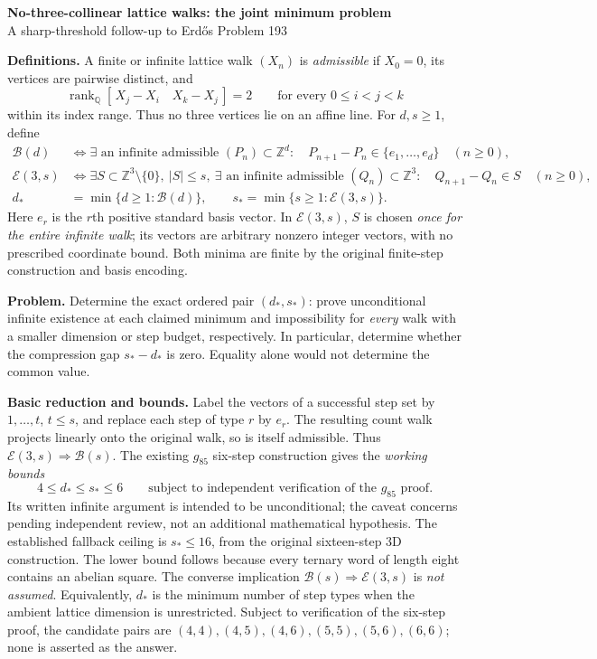 \documentclass[10pt]{article}
\newcommand{\Z}{\mathbb Z}
\newcommand{\Q}{\mathbb Q}
\newcommand{\B}{\mathcal B}
\newcommand{\E}{\mathcal E}
\begin{document}
\begin{center}
{\Large\bfseries No-three-collinear lattice walks: the joint minimum problem}\\[3pt]
{\small A sharp-threshold follow-up to Erd\H{o}s Problem 193}
\end{center}

\textbf{Definitions.}
A finite or infinite lattice walk $(X_n)$ is \emph{admissible} if $X_0=0$,
its vertices are pairwise distinct, and
\[
 \operatorname{rank}_{\Q}[\,X_j-X_i\quad X_k-X_j\,]=2
 \qquad\text{for every }0\le i<j<k
\]
within its index range. Thus no three vertices lie on an affine line.
For $d,s\ge1$, define
\begin{align*}
 \B(d)&\iff \exists\text{ an infinite admissible }(P_n)\subset\Z^d:
       \quad P_{n+1}-P_n\in\{e_1,\ldots,e_d\}\quad(n\ge0),\\
 \E(3,s)&\iff \exists S\subset\Z^3\setminus\{0\},\ |S|\le s,\
       \exists\text{ an infinite admissible }(Q_n)\subset\Z^3:\quad
       Q_{n+1}-Q_n\in S\quad(n\ge0),\\[-2pt]
 d_*&=\min\{d\ge1:\B(d)\},\qquad
 s_*=\min\{s\ge1:\E(3,s)\}.
\end{align*}
Here $e_r$ is the $r$th positive standard basis vector. In $\E(3,s)$,
$S$ is chosen \emph{once for the entire infinite walk}; its vectors are
arbitrary nonzero integer vectors, with no prescribed coordinate bound.
Both minima are finite by the original finite-step construction and basis encoding.

\textbf{Problem.}
Determine the exact ordered pair $(d_*,s_*)$: prove unconditional infinite
existence at each claimed minimum and impossibility for \emph{every} walk
with a smaller dimension or step budget, respectively.
In particular, determine whether the compression gap $s_*-d_*$ is zero.
Equality alone would not determine the common value.

\textbf{Basic reduction and bounds.}
Label the vectors of a successful step set by $1,\ldots,t$, $t\le s$,
and replace each step of type $r$ by $e_r$. The resulting count walk
projects linearly onto the original walk, so is itself admissible. Thus
$\E(3,s)\Rightarrow\B(s)$. The existing $g_{85}$ six-step construction gives
the \emph{working bounds}
\[
 \boxed{4\le d_*\le s_*\le6}
 \qquad\text{subject to independent verification of the $g_{85}$ proof.}
\]
Its written infinite argument is intended to be unconditional; the caveat
concerns pending independent review, not an additional mathematical hypothesis.
The established fallback ceiling is $s_*\le16$, from the original
sixteen-step 3D construction. The lower bound follows because every ternary
word of length eight contains an abelian square.
The converse implication $\B(s)\Rightarrow\E(3,s)$ is \emph{not assumed}.
Equivalently, $d_*$ is the minimum number of step types when the ambient
lattice dimension is unrestricted. Subject to verification of the six-step
proof, the candidate pairs are $(4,4),(4,5),(4,6),(5,5),(5,6),(6,6)$;
none is asserted as the answer.
\end{document}
